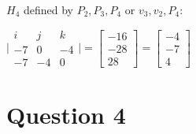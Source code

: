 \documentclass{article}
\begin{document}
\begin{enumerate}
        \paragraph{} $H_4$ defined by $P_2,P_3,P_4$ or $v_3, v_2, P_4$:

        $ \Bigg | \begin{matrix}
            i & j & k \\
            -7 & 0 & -4 \\
            -7 & -4 & 0
        \end{matrix} \Bigg | = \begin{bmatrix} -16 \\ -28 \\ 28 \end{bmatrix} = \begin{bmatrix} -4 \\ -7 \\ 4 \end{bmatrix}$


        

    \end{enumerate}

    \section*{Question 4}
\end{document}
